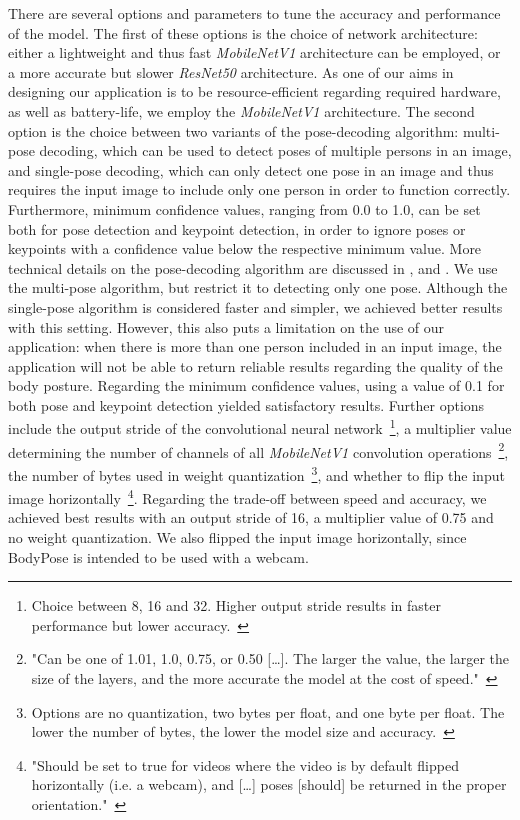 There are several options and parameters to tune the accuracy and performance of the model. The first of these options is the choice of network architecture: either a lightweight and thus fast \textit{MobileNetV1} architecture can be employed, or a more accurate but slower \textit{ResNet50} architecture. As one of our aims in designing our application is to be resource-efficient regarding required hardware, as well as battery-life, we employ the \textit{MobileNetV1} architecture. 
The second option is the choice between two variants of the pose-decoding algorithm: multi-pose decoding, which can be used to detect poses of multiple persons in an image, and single-pose decoding, which can only detect one pose in an image and thus requires the input image to include only one person in order to function correctly. Furthermore, minimum confidence values, ranging from 0.0 to 1.0, can be set both for pose detection and keypoint detection, in order to ignore poses or keypoints with a confidence value below the respective minimum value. More technical details on the pose-decoding algorithm are discussed in \cite{tf_js_pose_estimation}, \cite{pap2017accurate} and \cite{pap2018personlab}.
We use the multi-pose algorithm, but restrict it to detecting only one pose. Although the single-pose algorithm is considered faster and simpler\cite{tf_js_pose_estimation}, we achieved better results with this setting. However, this also puts a limitation on the use of our application: when there is more than one person included in an input image, the application will not be able to return reliable results regarding the quality of the body posture. Regarding the minimum confidence values, using a value of 0.1 for both pose and keypoint detection yielded satisfactory results.
Further options include the output stride of the convolutional neural network~\footnote{Choice between 8, 16 and 32. Higher output stride results in faster performance but lower accuracy.~\cite{tf_js_pose_estimation}}, a multiplier value determining the number of channels of all \textit{MobileNetV1} convolution operations~\footnote{"Can be one of 1.01, 1.0, 0.75, or 0.50 [\dots]. The larger the value, the larger the size of the layers, and the more accurate the model at the cost of speed."~\cite{posenet_github}}, the number of bytes used in weight quantization~\footnote{Options are no quantization, two bytes per float, and one byte per float. The lower the number of bytes, the lower the model size and accuracy.~\cite{posenet_github}}, and whether to flip the input image horizontally~\footnote{"Should be set to true for videos where the video is by default flipped horizontally (i.e. a webcam), and [\dots] poses [should] be returned in the proper orientation."~\cite{tf_js_pose_estimation}}.
Regarding the trade-off between speed and accuracy, we achieved best results with an output stride of 16, a multiplier value of 0.75 and no weight quantization. We also flipped the input image horizontally, since BodyPose is intended to be used with a webcam.

